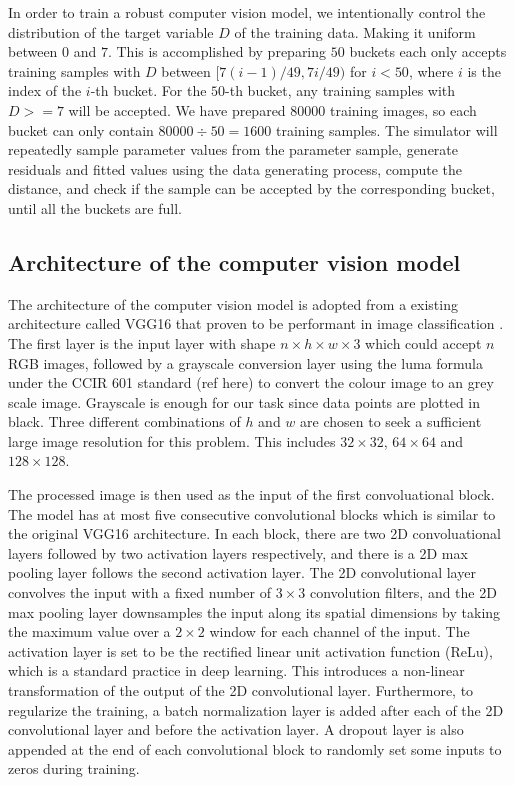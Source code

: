 \documentclass[]{interact}
\theoremstyle{plain}%
\theoremstyle{definition}
\theoremstyle{remark}
\begin{document}
In order to train a robust computer vision model, we intentionally
control the distribution of the target variable \(D\) of the training
data. Making it uniform between \(0\) and \(7\). This is accomplished by
preparing \(50\) buckets each only accepts training samples with \(D\)
between \([7(i - 1)/49, 7i/49)\) for \(i < 50\), where \(i\) is the
index of the \(i\)-th bucket. For the \(50\)-th bucket, any training
samples with \(D >= 7\) will be accepted. We have prepared 80000
training images, so each bucket can only contain
\(80000 \div 50 = 1600\) training samples. The simulator will repeatedly
sample parameter values from the parameter sample, generate residuals
and fitted values using the data generating process, compute the
distance, and check if the sample can be accepted by the corresponding
bucket, until all the buckets are full.

\hypertarget{architecture-of-the-computer-vision-model}{%
\subsection{Architecture of the computer vision
model}\label{architecture-of-the-computer-vision-model}}

The architecture of the computer vision model is adopted from a existing
architecture called VGG16 that proven to be performant in image
classification \citep{simonyan2014very}. The first layer is the input
layer with shape \(n \times h \times w \times 3\) which could accept
\(n\) RGB images, followed by a grayscale conversion layer using the
luma formula under the CCIR 601 standard (ref here) to convert the
colour image to an grey scale image. Grayscale is enough for our task
since data points are plotted in black. Three different combinations of
\(h\) and \(w\) are chosen to seek a sufficient large image resolution
for this problem. This includes \(32 \times 32\), \(64 \times 64\) and
\(128 \times 128\).

The processed image is then used as the input of the first
convoluational block. The model has at most five consecutive
convolutional blocks which is similar to the original VGG16
architecture. In each block, there are two 2D convoluational layers
followed by two activation layers respectively, and there is a 2D max
pooling layer follows the second activation layer. The 2D convolutional
layer convolves the input with a fixed number of \(3 \times 3\)
convolution filters, and the 2D max pooling layer downsamples the input
along its spatial dimensions by taking the maximum value over a
\(2 \times 2\) window for each channel of the input. The activation
layer is set to be the rectified linear unit activation function (ReLu),
which is a standard practice in deep learning. This introduces a
non-linear transformation of the output of the 2D convolutional layer.
Furthermore, to regularize the training, a batch normalization layer is
added after each of the 2D convolutional layer and before the activation
layer. A dropout layer is also appended at the end of each convolutional
block to randomly set some inputs to zeros during training.
\end{document}
